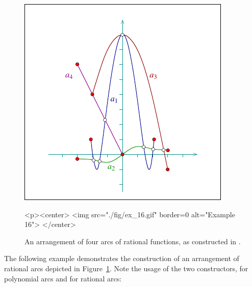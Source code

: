 \begin{figure}[h] 
\begin{ccTexOnly} 
  \begin{center}
  \includegraphics{Arrangement_on_surface_2/fig/ex_16}
  \end{center}
\end{ccTexOnly}
\begin{ccHtmlOnly}
  <p><center>
  <img src="./fig/ex_16.gif" border=0 alt="Example 16">
  </center>
\end{ccHtmlOnly}
\caption{An arrangement of four arcs of rational functions, as
constructed in .\label{arr_fig:ex_16}}
\end{figure}

The following example demonstrates the construction of an
arrangement of rational arcs depicted in
Figure~\ref{arr_fig:ex_16}. Note the usage of the two
constructors, for polynomial arcs and for rational arcs:

\pagebreak[3]


